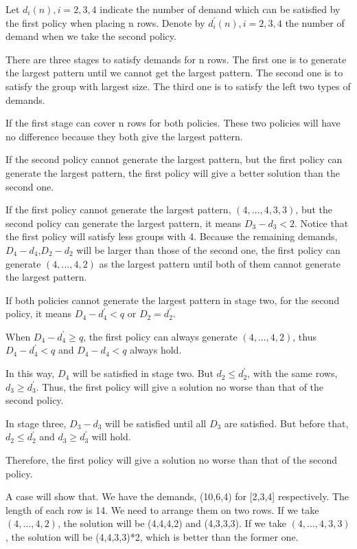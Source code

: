 \begin{pf}

Let $d_i(n), i =2,3,4$ indicate the number of demand which can be satisfied by the first policy when placing n rows. Denote by $d_i^{'}(n), i =2,3,4$ the number of demand when we take the second policy.

There are three stages to satisfy demands for n rows. The first one is to generate the largest pattern until we cannot get the largest pattern. The second one is to satisfy the group with largest size. The third one is to satisfy the left two types of demands.

If the first stage can cover n rows for both policies. These two policies will have no difference because they both give the largest pattern.

If the second policy cannot generate the largest pattern, but the first policy can generate the largest pattern, the first policy will give a better solution than the second one.

If the first policy cannot generate the largest pattern, $(4,\ldots,4,3,3)$, but the second policy can generate the largest pattern, it means $D_3- d_3 < 2$. Notice that the first policy will satisfy less groups with 4. Because the remaining demands, $D_4 - d_4$,$D_2 - d_2$ will be larger than those of the second one, the first policy can generate $(4,\ldots,4,2)$ as the largest pattern until both of them cannot generate the largest pattern.

If both policies cannot generate the largest pattern in stage two, for the second policy, it means $D_4 - d_4^{'} <q$ or $D_2 = d_2^{'}.$

When $D_4 - d_4^{'} \geq q$, the first policy can always generate $(4,\ldots,4,2)$, thus $D_4 - d_4^{'} <q$ and $D_4 - d_4 <q$ always hold.

In this way, $D_4$ will be satisfied in stage two. But $d_2 \leq d_2^{'}$, with the same rows, $d_3 \geq d_3^{'}$. Thus, the first policy will give a solution no worse than that of the second policy.

In stage three, $D_3- d_3$ will be satisfied until all $D_3$ are satisfied. But before that, $d_2 \leq d_2^{'}$ and $d_3 \geq d_3^{'}$ will hold.

Therefore, the first policy will give a solution no worse than that of the second policy.

\end{pf}

A case will show that. We have the demands, (10,6,4) for [2,3,4] respectively. The length of each row is 14. We need to arrange them on two rows. If we take $(4,\ldots,4,2)$, the solution will be (4,4,4,2) and (4,3,3,3). If we take $(4,\ldots,4,3,3) $, the solution will be (4,4,3,3)*2, which is better than the former one.

